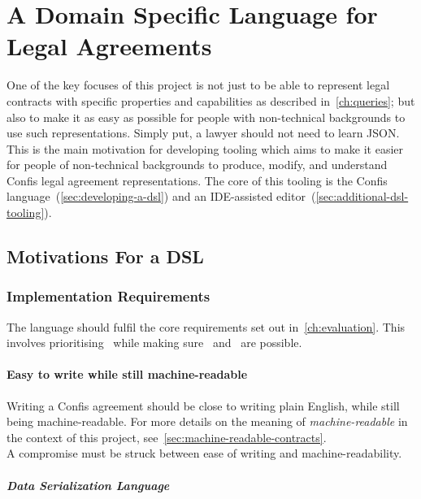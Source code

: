 \chapter{A Domain Specific Language for Legal Agreements}\label{ch:lang}

One of the key focuses of this project is not just to be able to represent legal contracts with specific properties and capabilities as described in~\autoref{ch:queries};
but also to make it as easy as possible for people with non-technical backgrounds to use such representations.
Simply put, a lawyer should not need to learn JSON.\\

This is the main motivation for developing tooling which aims to make it easier for people of non-technical backgrounds to produce, modify, and understand Confis legal agreement representations.
The core of this tooling is the Confis language~(\autoref{sec:developing-a-dsl}) and an IDE-assisted editor~(\autoref{sec:additional-dsl-tooling}).


\section{Motivations For a DSL}\label{sec:developing-a-dsl}

\subsection{Implementation Requirements}\label{subsec:dsl:requirements}

The language should fulfil the core requirements set out in~\autoref{ch:evaluation}.
This involves prioritising~ while making sure~ and~ are possible.

\subsubsection{Easy to write while still machine-readable}

Writing a Confis agreement should be close to writing plain English, while still being machine-readable.
For more details on the meaning of \emph{machine-readable} in the context of this project, see~\autoref{sec:machine-readable-contracts}.\\


A compromise must be struck between ease of writing and machine-readability.

\paragraph{Data Serialization Language}

